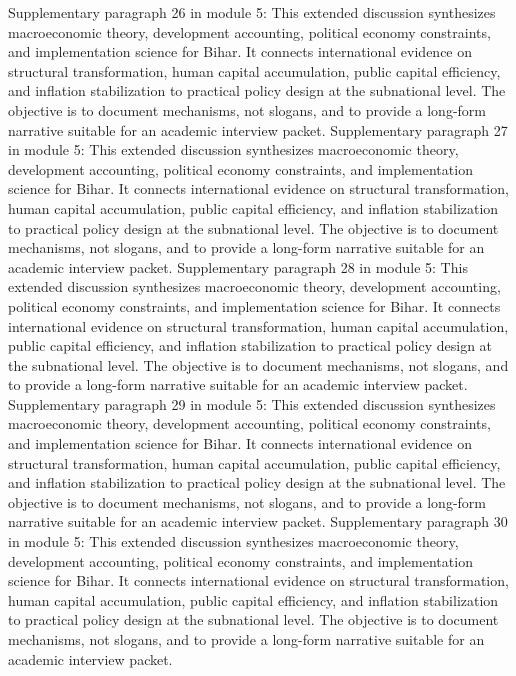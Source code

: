 \documentclass[preprint,12pt]{elsarticle}
\begin{document}
Supplementary paragraph 26 in module 5: This extended discussion synthesizes macroeconomic theory, development accounting, political economy constraints, and implementation science for Bihar. It connects international evidence on structural transformation, human capital accumulation, public capital efficiency, and inflation stabilization to practical policy design at the subnational level. The objective is to document mechanisms, not slogans, and to provide a long-form narrative suitable for an academic interview packet.
Supplementary paragraph 27 in module 5: This extended discussion synthesizes macroeconomic theory, development accounting, political economy constraints, and implementation science for Bihar. It connects international evidence on structural transformation, human capital accumulation, public capital efficiency, and inflation stabilization to practical policy design at the subnational level. The objective is to document mechanisms, not slogans, and to provide a long-form narrative suitable for an academic interview packet.
Supplementary paragraph 28 in module 5: This extended discussion synthesizes macroeconomic theory, development accounting, political economy constraints, and implementation science for Bihar. It connects international evidence on structural transformation, human capital accumulation, public capital efficiency, and inflation stabilization to practical policy design at the subnational level. The objective is to document mechanisms, not slogans, and to provide a long-form narrative suitable for an academic interview packet.
Supplementary paragraph 29 in module 5: This extended discussion synthesizes macroeconomic theory, development accounting, political economy constraints, and implementation science for Bihar. It connects international evidence on structural transformation, human capital accumulation, public capital efficiency, and inflation stabilization to practical policy design at the subnational level. The objective is to document mechanisms, not slogans, and to provide a long-form narrative suitable for an academic interview packet.
Supplementary paragraph 30 in module 5: This extended discussion synthesizes macroeconomic theory, development accounting, political economy constraints, and implementation science for Bihar. It connects international evidence on structural transformation, human capital accumulation, public capital efficiency, and inflation stabilization to practical policy design at the subnational level. The objective is to document mechanisms, not slogans, and to provide a long-form narrative suitable for an academic interview packet.
\end{document}
